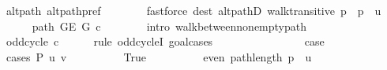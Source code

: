 \begin{isabellebody}
\ alt{\isacharunderscore}{\kern0pt}path\ alt{\isacharunderscore}{\kern0pt}path{\isacharunderscore}{\kern0pt}pref\isanewline
\ \ \ \ \ \ \isamarkupfalse%
\ {\isacharparenleft}{\kern0pt}fastforce\ dest{\isacharcolon}{\kern0pt}\ alt{\isacharunderscore}{\kern0pt}pathD{\isacharparenleft}{\kern0pt}{}{\isacharparenright}{\kern0pt}\ walk{\isacharunderscore}{\kern0pt}transitive{\isacharbrackleft}{\kern0pt}\ {\isacharquery}{\kern0pt}p\ {\isacharequal}{\kern0pt}\ {\isachardoublequoteopen}p\ {\isacharat}{\kern0pt}\ {\isacharbrackleft}{\kern0pt}u{\isacharbrackright}{\kern0pt}{\isachardoublequoteclose}{\isacharbrackright}{\kern0pt}{\isacharparenright}{\kern0pt}\isanewline
\ \ \ \ \isamarkupfalse%
\ {\isachardoublequoteopen}path\ {\isacharparenleft}{\kern0pt}G{\isachardot}{\kern0pt}E\ G{\isacharparenright}{\kern0pt}\ {\isacharquery}{\kern0pt}c{\isachardoublequoteclose}\isanewline
\ \ \ \ \ \ \isamarkupfalse%
\ {\isacharparenleft}{\kern0pt}intro\ walk{\isacharunderscore}{\kern0pt}between{\isacharunderscore}{\kern0pt}nonempty{\isacharunderscore}{\kern0pt}path{\isacharparenright}{\kern0pt}\isanewline
\ \ \ \ \isamarkupfalse%
\ \isamarkupfalse%
\ {\isachardoublequoteopen}odd{\isacharunderscore}{\kern0pt}cycle\ {\isacharquery}{\kern0pt}c{\isachardoublequoteclose}\isanewline
\ \ \ \ \isamarkupfalse%
\ {\isacharparenleft}{\kern0pt}rule\ odd{\isacharunderscore}{\kern0pt}cycleI{\isacharcomma}{\kern0pt}\ goal{\isacharunderscore}{\kern0pt}cases{\isacharparenright}{\kern0pt}\isanewline
\ \ \ \ \ \ \isamarkupfalse%
\ {}\isanewline
\ \ \ \ \ \ \isamarkupfalse%
\ {\isacharquery}{\kern0pt}case\isanewline
\ \ \ \ \ \ \isamarkupfalse%
\ {\isacharparenleft}{\kern0pt}cases\ {\isachardoublequoteopen}P{\isacharprime}{\kern0pt}{\isacharprime}{\kern0pt}\ {\isacharbraceleft}{\kern0pt}u{\isacharcomma}{\kern0pt}\ v{\isacharbraceright}{\kern0pt}{\isachardoublequoteclose}{\isacharparenright}{\kern0pt}\isanewline
\ \ \ \ \ \ \ \ \isamarkupfalse%
\ True\isanewline
\ \ \ \ \ \ \ \ \isamarkupfalse%
\ {\isachardoublequoteopen}even\ {\isacharparenleft}{\kern0pt}path{\isacharunderscore}{\kern0pt}length\ {\isacharparenleft}{\kern0pt}p\ {\isacharat}{\kern0pt}\ {\isacharbrackleft}{\kern0pt}u{\isacharbrackright}{\kern0pt}{\isacharparenright}{\kern0pt}{\isacharparenright}{\kern0pt}{\isachardoublequoteclose}\isanewline
\ \ \ \ \ \ \ \ \isamarkupfalse%
\ {\isacharminus}{\kern0pt}\isanewline

\end{isabellebody}
